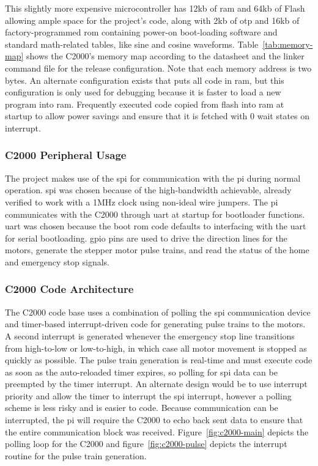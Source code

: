 This slightly more expensive microcontroller has 12\gls{kb} of \gls{ram} and 64\gls{kb} of Flash allowing ample space for the project's code, along with 2\gls{kb} of \gls{otp} and 16\gls{kb} of factory-programmed \gls{rom} containing power-on boot-loading software and standard math-related tables, like sine and cosine waveforms.
Table~\ref{tab:memory-map} shows the C2000's memory map according to the datasheet\cite{piccolo} and the linker command file for the release configuration.
Note that each memory address is two bytes.
An alternate configuration exists that puts all code in \gls{ram}, but this configuration is only used for debugging because it is faster to load a new program into \gls{ram}.
Frequently executed code copied from flash into \gls{ram} at startup to allow power savings and ensure that it is fetched with 0 wait states on interrupt.

\subsubsection{C2000 Peripheral Usage}
The project makes use of the \gls{spi} for communication with the \gls{pi} during normal operation.
\gls{spi} was chosen because of the high-bandwidth achievable, already verified to work with a 1MHz clock using non-ideal wire jumpers.
The \gls{pi} communicates with the C2000 through \gls{uart} at startup for bootloader functions.
\gls{uart} was chosen because the boot \gls{rom} code defaults to interfacing with the \gls{uart} for serial bootloading.
\gls{gpio} pins are used to drive the direction lines for the motors, generate the stepper motor pulse trains, and read the status of the home and emergency stop signals.

\subsubsection{C2000 Code Architecture}
The C2000 code base uses a combination of polling the \gls{spi} communication device and timer-based interrupt-driven code for generating pulse trains to the motors.
A second interrupt is generated whenever the emergency stop line transitions from high-to-low or low-to-high, in which case all motor movement is stopped as quickly as possible.
The pulse train generation is real-time and must execute code as soon as the auto-reloaded timer expires, so polling for \gls{spi} data can be preempted by the timer interrupt.
An alternate design would be to use interrupt priority and allow the timer to interrupt the \gls{spi} interrupt, however a polling scheme is less risky and is easier to code.
Because communication can be interrupted, the \gls{pi} will require the C2000 to echo back sent data to ensure that the entire communication block was received.
Figure~\ref{fig:c2000-main} depicts the polling loop for the C2000 and figure~\ref{fig:c2000-pulse} depicts the interrupt routine for the pulse train generation.

